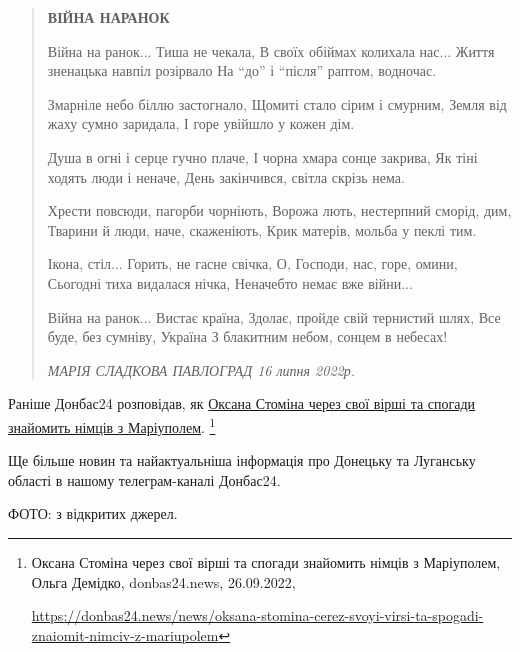 \begin{quote}
\textbf{ВІЙНА НАРАНОК}

Війна на ранок... Тиша не чекала, В своїх обіймах колихала нас... Життя
зненацька навпіл розірвало На \enquote{до} і \enquote{після} раптом, водночас.
\bigskip

Змарніле небо біллю застогнало, Щомиті стало сірим і смурним, Земля від жаху
сумно заридала, І горе увійшло у кожен дім.
\bigskip

Душа в огні і серце гучно плаче, І чорна хмара сонце закрива, Як тіні ходять
люди і неначе, День закінчився, світла скрізь нема.
\bigskip

Хрести повсюди, пагорби чорніють, Ворожа лють, нестерпний сморід, дим, Тварини
й люди, наче, скаженіють, Крик матерів, мольба у пеклі тим.
\bigskip

Ікона, стіл... Горить, не гасне свічка, О, Господи, нас, горе, омини, Сьогодні
тиха видалася нічка, Неначебто немає вже війни...
\bigskip

Війна на ранок... Вистає країна, Здолає, пройде свій тернистий шлях, Все буде,
без сумніву, Україна З блакитним небом, сонцем в небесах!
\bigskip

\emph{МАРІЯ СЛАДКОВА ПАВЛОГРАД 16 липня 2022р.}
\end{quote}

Раніше Донбас24 розповідав, як \href{https://donbas24.news/news/oksana-stomina-cerez-svoyi-virsi-ta-spogadi-znaiomit-nimciv-z-mariupolem}{Оксана Стоміна через свої вірші та спогади
знайомить німців з Маріуполем}.%
\footnote{Оксана Стоміна через свої вірші та спогади знайомить німців з Маріуполем, Ольга Демідко, donbas24.news, 26.09.2022, %
\par\url{https://donbas24.news/news/oksana-stomina-cerez-svoyi-virsi-ta-spogadi-znaiomit-nimciv-z-mariupolem}}

Ще більше новин та найактуальніша інформація про Донецьку та Луганську області
в нашому телеграм-каналі Донбас24.

ФОТО: з відкритих джерел.

